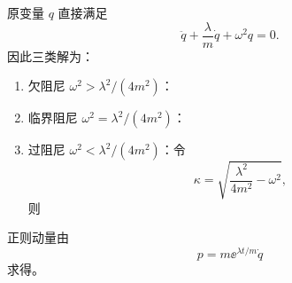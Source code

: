 \begin{question}
\begin{solution}
原变量 $q$ 直接满足
\[
  \ddot q+\frac{\lambda}{m}\dot q+\omega^2q=0.
\]
因此三类解为：
\begin{enumerate}
  \item 欠阻尼 $\omega^2>\lambda^2/(4m^2)$：
  \item 临界阻尼 $\omega^2=\lambda^2/(4m^2)$：
  \item 过阻尼 $\omega^2<\lambda^2/(4m^2)$：令
  \[
    \kappa=\sqrt{\frac{\lambda^2}{4m^2}-\omega^2},
  \]
  则
\end{enumerate}
正则动量由
\[
  p=m\ee^{\lambda t/m}\dot q
\]
求得。
\end{solution}

\end{question}
